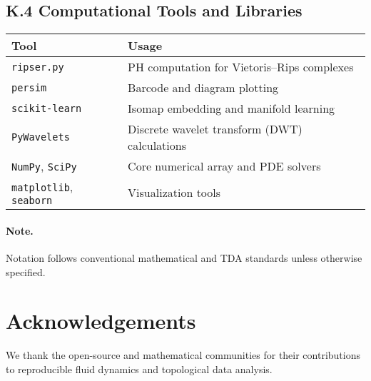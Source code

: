 \documentclass[11pt]{article}
\theoremstyle{definition}
\begin{document}
\subsection*{K.4 Computational Tools and Libraries}
\begin{tabular}{ll}
\textbf{Tool} & \textbf{Usage} \\
\hline
\texttt{ripser.py} & PH computation for Vietoris--Rips complexes \\
\texttt{persim} & Barcode and diagram plotting \\
\texttt{scikit-learn} & Isomap embedding and manifold learning \\
\texttt{PyWavelets} & Discrete wavelet transform (DWT) calculations \\
\texttt{NumPy}, \texttt{SciPy} & Core numerical array and PDE solvers \\
\texttt{matplotlib}, \texttt{seaborn} & Visualization tools \\
\end{tabular}

\paragraph{Note.} Notation follows conventional mathematical and TDA standards unless otherwise specified.


\section*{Acknowledgements}
We thank the open-source and mathematical communities for their contributions to reproducible fluid dynamics and topological data analysis.
\end{document}
